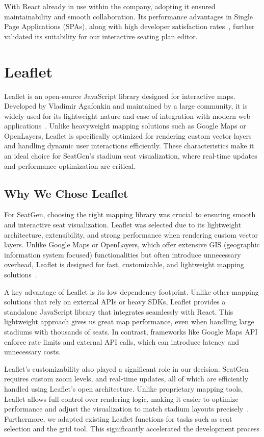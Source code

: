 With React already in use within the company, adopting it ensured maintainability and smooth collaboration. Its performance advantages in Single Page Applications (SPAs), along with high developer satisfaction rates~\cite{SPAComp}, further validated its suitability for our interactive seating plan editor.

\section{Leaflet}
Leaflet is an open-source JavaScript library designed for interactive maps. Developed by Vladimir Agafonkin and maintained by a large community, it is widely used for its lightweight nature and ease of integration with modern web applications~\cite{Leaflet}. Unlike heavyweight mapping solutions such as Google Maps or OpenLayers, Leaflet is specifically optimized for rendering custom vector layers and handling dynamic user interactions efficiently. These characteristics make it an ideal choice for SeatGen’s stadium seat visualization, where real-time updates and performance optimization are critical.

\subsection{Why We Chose Leaflet}
For SeatGen, choosing the right mapping library was crucial to ensuring smooth and interactive seat visualization. Leaflet was selected due to its lightweight architecture, extensibility, and strong performance when rendering custom vector layers. Unlike Google Maps or OpenLayers, which offer extensive GIS (geographic information system focused) functionalities but often introduce unnecessary overhead, Leaflet is designed for fast, customizable, and lightweight mapping solutions~\cite{Leaflet}. 

A key advantage of Leaflet is its low dependency footprint. Unlike other mapping solutions that rely on external APIs or heavy SDKs, Leaflet provides a standalone JavaScript library that integrates seamlessly with React. This lightweight approach gives us great map performance, even when handling large stadiums with thousands of seats. In contrast, frameworks like Google Maps API enforce rate limits and external API calls, which can introduce latency and unnecessary costs.

Leaflet’s customizability also played a significant role in our decision. SeatGen requires custom zoom levels, and real-time updates, all of which are efficiently handled using Leaflet’s open architecture. Unlike proprietary mapping tools, Leaflet allows full control over rendering logic, making it easier to optimize performance and adjust the visualization to match stadium layouts precisely~\cite{Leaflet}. Furthermore, we adapted existing Leaflet functions for tasks such as seat selection and the grid tool. This significantly accelerated the development process

